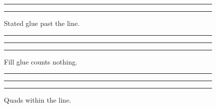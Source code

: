 \documentclass{article}
\begin{document}
\begin{figure}
\centering
\rule{0.45\textwidth}{1cm}\hspace{1in}\rule{0.45\textwidth}{1cm}
\caption{Stated glue past the line.}
\end{figure}
\begin{figure}
\centering
\rule{0.3\textwidth}{1cm}\hfill\rule{0.3\textwidth}{1cm}\hfill\rule{0.3\textwidth}{1cm}
\caption{Fill glue counts nothing.}
\end{figure}
\begin{figure}
\centering
\rule{0.3\textwidth}{1cm}\quad\rule{0.3\textwidth}{1cm}\quad\rule{0.3\textwidth}{1cm}
\caption{Quads within the line.}
\end{figure}
\end{document}
